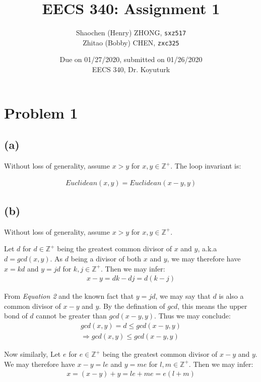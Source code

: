 \documentclass[12pt]{article}
\newcommand{\inlinecode}{\texttt}
\begin{document}
\title{\textbf{EECS 340: Assignment 1}}

\author{Shaochen (Henry) ZHONG, \inlinecode{sxz517} \\ Zhitao (Bobby) CHEN, \inlinecode{zxc325}}
\date{Due on 01/27/2020, submitted on 01/26/2020 \\ EECS 340, Dr. Koyuturk}
\maketitle

\section{Problem 1}
\subsection{(a)}
Without loss of generality, assume $x > y$ for $x, y \in \mathbb{Z^+}$. The loop invariant is:

\begin{gather}
    Euclidean(x, y) = Euclidean(x - y, y)
\end{gather}

\subsection{(b)}
Without loss of generality, assume $x > y$ for $x, y \in \mathbb{Z^+}$.

Let $d$ for $d \in \mathbb{Z^+}$ being the greatest common divisor of $x$ and $y$, a.k.a $d = gcd(x, y)$. As $d$ being a divisor of both $x$ and $y$, we may therefore have $x = kd$ and $y = jd$ for $k, j \in \mathbb{Z^+}$. Then we may infer:
\begin{gather}
    x - y = dk - dj = d(k - j)
\end{gather}

From \textit{Equation 2} and the known fact that $y = jd$, we may say that $d$ is also a common divisor of $x - y$ and $y$. By the defination of $gcd$, this means the upper bond of $d$ cannot be greater than $gcd(x-y, y)$. Thus we may conclude:
\begin{gather}
    gcd(x, y) = d \leq gcd(x-y, y) \nonumber \\
    \Rightarrow gcd(x, y) \leq gcd(x-y, y)
\end{gather}

Now similarly, Let $e$ for $e \in \mathbb{Z^+}$ being the greatest common divisor of $x-y$ and $y$. We may therefore have $x - y = le$ and $y = me$ for $l, m \in \mathbb{Z^+}$. Then we may infer:
\begin{gather}
    x = (x - y) + y = le + me = e(l + m)
\end{gather}
\end{document}

